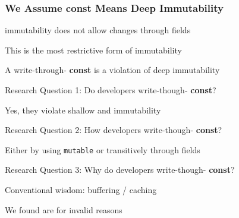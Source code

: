 \documentclass[aspectratio=169]{beamer}
\newcommand{\const}{{\color{blue} \bfseries \ttfamily const}}
\begin{document}
  \begin{frame}
    \frametitle{We Assume \const{} Means Deep Immutability}
    \Large

     immutability does not allow changes through fields

    \vspace{1em}
    This is the most restrictive form of immutability

    \vspace{1em}
    A write-through-\const{} is a violation of deep immutability

    \vspace{1em}
    \centering
  \end{frame}

  \begin{frame}
    \Large
    {
     Research Question 1: Do developers write-though-\const{}?}

    \vspace{1em}
    Yes, they violate shallow and  immutability
  \end{frame}

  \begin{frame}
    \Large
    {
     Research Question 2: How developers write-though-\const{}?}

    \vspace{1em}
    Either by using \texttt{mutable} or transitively through fields
  \end{frame}

  \begin{frame}
    \Large
    {
     Research Question 3: Why do developers write-though-\const{}?}

    \vspace{1em}
    Conventional wisdom: buffering / caching

    \vspace{1em}
    We found  are for invalid reasons
  \end{frame}
\end{document}
